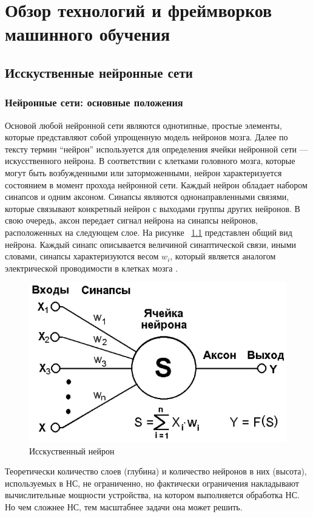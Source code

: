 \documentclass[a4paper,english,russian]{G2-105}
\begin{document}
\chapter{Обзор технологий и фреймворков машинного обучения} \ttl \ttl
\section{Исскуственные нейронные сети} \ttl \ttl
\subsection{Нейронные сети: основные положения} \ttl
\par Основой любой нейронной сети являются однотипные, простые элементы, которые представляют собой упрощенную модель нейронов мозга. Далее по тексту термин “нейрон” используется для определения ячейки нейронной сети --- искусственного нейрона. В соответствии с клетками головного мозга, которые могут быть возбужденными или заторможенными, нейрон характеризуется состоянием в момент прохода нейронной сети. Каждый нейрон обладает набором синапсов и одним аксоном. Синапсы являются однонаправленными связями, которые связывают конкретный нейрон с выходами группы других нейронов. В свою очередь, аксон передает сигнал нейрона на синапсы нейронов, расположенных на следующем слое. На рисунке ~\ref{neuron} представлен общий вид нейрона. Каждый синапс описывается величиной синаптической связи, иными словами, синапсы характеризуются весом $w_i$, который является аналогом электрической проводимости в клетках мозга \cite{4}.
\begin{figure}
	\begin{center}
    		\includegraphics[width=0.6\linewidth]{neuron.png}
    		\caption{Исскуственный нейрон}
		\label{neuron}
	\end{center}
\end{figure}
\par Теоретически количество слоев (глубина) и количество нейронов в них (высота), используемых в НС, не ограниченно, но фактически ограничения накладывают вычислительные мощности устройства, на котором выполняется обработка НС. Но чем сложнее НС, тем масштабнее задачи она может решить. 
\end{document}
